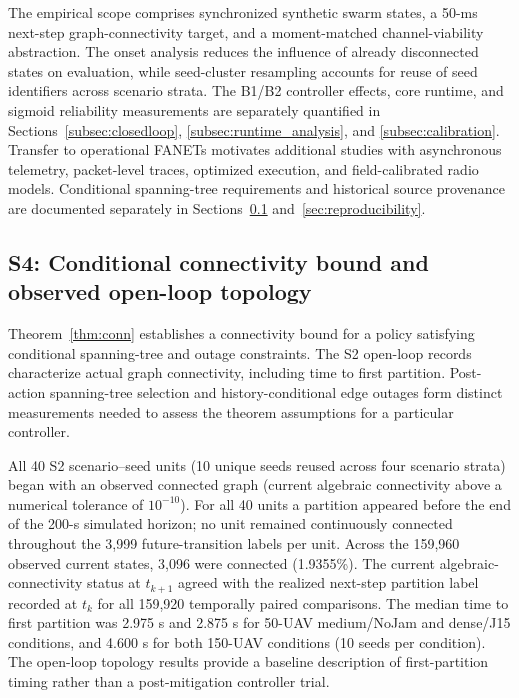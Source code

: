 \documentclass[preprint,12pt]{elsarticle}
\theoremstyle{definition}\newtheorem{definition}{Definition}
\theoremstyle{plain}\newtheorem{theorem}{Theorem}
\theoremstyle{plain}\newtheorem{lemma}{Lemma}
\theoremstyle{plain}\newtheorem{corollary}{Corollary}
\theoremstyle{plain}\newtheorem{assumption}{Assumption}
\theoremstyle{remark}\newtheorem{remark}[theorem]{Remark}
\begin{document}
The empirical scope comprises synchronized synthetic swarm states, a 50-ms next-step graph-connectivity target, and a moment-matched channel-viability abstraction. The onset analysis reduces the influence of already disconnected states on evaluation, while seed-cluster resampling accounts for reuse of seed identifiers across scenario strata. The B1/B2 controller effects, core runtime, and sigmoid reliability measurements are separately quantified in Sections~\ref{subsec:closedloop}, \ref{subsec:runtime_analysis}, and \ref{subsec:calibration}. Transfer to operational FANETs motivates additional studies with asynchronous telemetry, packet-level traces, optimized execution, and field-calibrated radio models. Conditional spanning-tree requirements and historical source provenance are documented separately in Sections~\ref{subsec:s4_theorem_evidence} and~\ref{sec:reproducibility}.\par

\subsection{S4: Conditional connectivity bound and observed open-loop topology}\label{subsec:s4_theorem_evidence}
Theorem~\ref{thm:conn} establishes a connectivity bound for a policy satisfying conditional spanning-tree and outage constraints. The S2 open-loop records characterize actual graph connectivity, including time to first partition. Post-action spanning-tree selection and history-conditional edge outages form distinct measurements needed to assess the theorem assumptions for a particular controller.

All 40 S2 scenario--seed units (10 unique seeds reused across four scenario strata) began with an observed connected graph (current algebraic connectivity above a numerical tolerance of $10^{-10}$). For all 40 units a partition appeared before the end of the 200-s simulated horizon; no unit remained continuously connected throughout the 3,999 future-transition labels per unit. Across the 159,960 observed current states, 3,096 were connected (1.9355\%). The current algebraic-connectivity status at $t_{k+1}$ agreed with the realized next-step partition label recorded at $t_k$ for all 159,920 temporally paired comparisons. The median time to first partition was 2.975 s and 2.875 s for 50-UAV medium/NoJam and dense/J15 conditions, and 4.600 s for both 150-UAV conditions (10 seeds per condition). The open-loop topology results provide a baseline description of first-partition timing rather than a post-mitigation controller trial.
\end{document}
